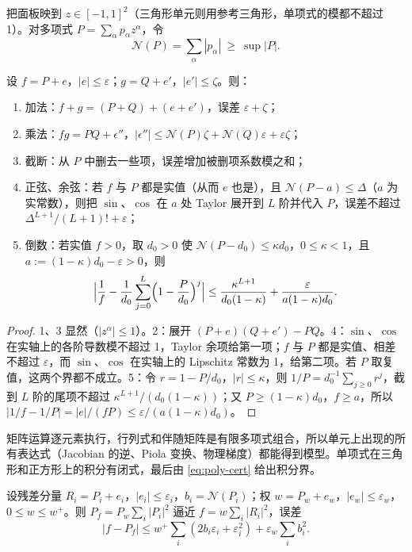 \documentclass[11pt,a4paper,fontset=fandol]{ctexart}
\begin{document}
把面板映到 $z\in[-1,1]^2$（三角形单元则用参考三角形，单项式的模都不超过 1）。对多项式 $P=\sum_\alpha p_\alpha z^\alpha$，令
\[
\mathcal N(P)=\sum_\alpha|p_\alpha|\ \ge\ \sup|P| .
\]

\begin{lemma}[模型算术]
\label{lem:model-arith}
设 $f=P+e$，$|e|\le\varepsilon$；$g=Q+e'$，$|e'|\le\zeta$。则：
\begin{enumerate}
\item 加法：$f+g=(P+Q)+(e+e')$，误差 $\varepsilon+\zeta$；
\item 乘法：$fg=PQ+\epsilon''$，$|\epsilon''|\le\mathcal N(P)\zeta+\mathcal N(Q)\varepsilon+\varepsilon\zeta$；
\item 截断：从 $P$ 中删去一些项，误差增加被删项系数模之和；
\item 正弦、余弦：若 $f$ 与 $P$ 都是实值（从而 $e$ 也是），且 $\mathcal N(P-a)\le\Delta$（$a$ 为实常数），则把 $\sin$、$\cos$ 在 $a$ 处 Taylor 展开到 $L$ 阶并代入 $P$，误差不超过 $\Delta^{L+1}/(L+1)!+\varepsilon$；
\item 倒数：若实值 $f>0$，取 $d_0>0$ 使 $\mathcal N(P-d_0)\le\kappa d_0$，$0\le\kappa<1$，且 $a:=(1-\kappa)d_0-\varepsilon>0$，则
\[
\Bigl|\frac1f-\frac1{d_0}\sum_{j=0}^{L}\Bigl(1-\frac{P}{d_0}\Bigr)^j\Bigr|\le\frac{\kappa^{L+1}}{d_0(1-\kappa)}+\frac{\varepsilon}{a(1-\kappa)d_0} .
\]
\end{enumerate}
\end{lemma}

\begin{proof}
1、3 显然（$|z^\alpha|\le1$）。2：展开 $(P+e)(Q+e')-PQ$。4：$\sin$、$\cos$ 在实轴上的各阶导数模不超过 1，Taylor 余项给第一项；$f$ 与 $P$ 都是实值、相差不超过 $\varepsilon$，而 $\sin$、$\cos$ 在实轴上的 Lipschitz 常数为 1，给第二项。若 $P$ 取复值，这两个界都不成立。5：令 $r=1-P/d_0$，$|r|\le\kappa$，则 $1/P=d_0^{-1}\sum_{j\ge0}r^j$，截到 $L$ 阶的尾项不超过 $\kappa^{L+1}/(d_0(1-\kappa))$；又 $P\ge(1-\kappa)d_0$，$f\ge a$，所以 $|1/f-1/P|=|e|/(fP)\le\varepsilon/(a(1-\kappa)d_0)$。
\end{proof}

矩阵运算逐元素执行，行列式和伴随矩阵是有限多项式组合，所以单元上出现的所有表达式（Jacobian 的逆、Piola 变换、物理梯度）都能得到模型。单项式在三角形和正方形上的积分有闭式，最后由 \eqref{eq:poly-cert} 给出积分界。

\begin{lemma}
\label{lem:square-last}
设残差分量 $R_i=P_i+e_i$，$|e_i|\le\varepsilon_i$，$b_i=\mathcal N(P_i)$；权 $w=P_w+e_w$，$|e_w|\le\varepsilon_w$，$0\le w\le w^+$。则 $P_f=P_w\sum_i|P_i|^2$ 逼近 $f=w\sum_i|R_i|^2$，误差
\[
|f-P_f|\le w^+\sum_i(2b_i\varepsilon_i+\varepsilon_i^2)+\varepsilon_w\sum_ib_i^2 .
\]
\end{lemma}
\end{document}
